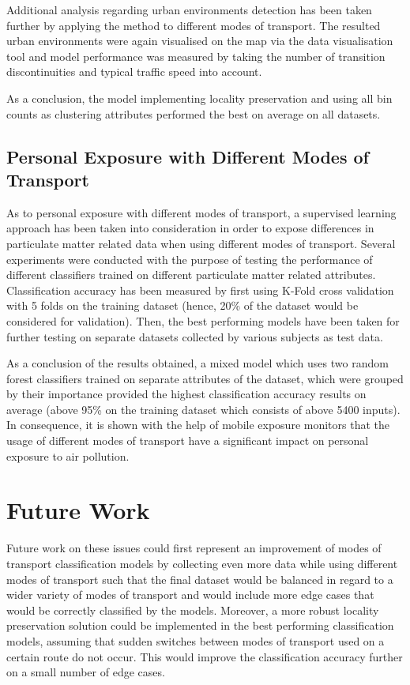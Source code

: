 \documentclass[bsc,frontabs,twoside,singlespacing, parskip,deptreport]{infthesis}     %
\begin{document}
Additional analysis regarding urban environments detection has been taken further by applying the method to different modes of transport. The resulted urban environments were again visualised on the map via the data visualisation tool and model performance was measured by taking the number of transition discontinuities and typical traffic speed into account.

As a conclusion, the model implementing locality preservation and using all bin counts as clustering attributes performed the best on average on all datasets.

\subsection{Personal Exposure with Different Modes of Transport}

As to personal exposure with different modes of transport, a supervised learning approach has been taken into consideration in order to expose differences in particulate matter related data when using different modes of transport. Several experiments were conducted with the purpose of testing the performance of different classifiers trained on different particulate matter related attributes. Classification accuracy has been measured by first using K-Fold cross validation with 5 folds on the training dataset (hence, 20\% of the dataset would be considered for validation). Then, the best performing models have been taken for further testing on separate datasets collected by various subjects as test data. 

As a conclusion of the results obtained, a mixed model which uses two random forest classifiers trained on separate attributes of the dataset, which were grouped by their importance provided the highest classification accuracy results on average (above 95\% on the training dataset which consists of above 5400 inputs). In consequence, it is shown with the help of mobile exposure monitors that the usage of different modes of transport have a significant impact on personal exposure to air pollution.


\section{Future Work}

Future work on these issues could first represent an improvement of modes of transport classification models by collecting even more data while using different modes of transport such that the final dataset would be balanced in regard to a wider variety of modes of transport and would include more edge cases that would be correctly classified by the models. Moreover, a more robust locality preservation solution could be implemented in the best performing classification models, assuming that sudden switches between modes of transport used on a certain route do not occur. This would improve the classification accuracy further on a small number of edge cases.
\end{document}
